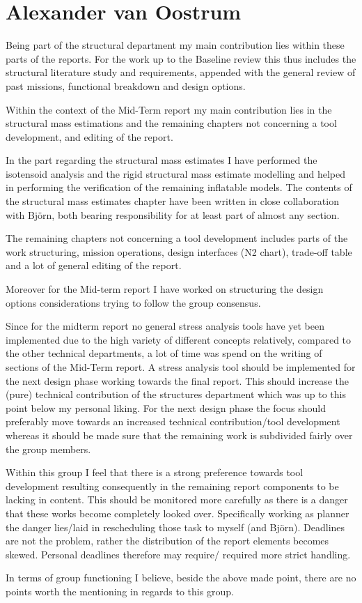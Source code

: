 \section{Alexander van Oostrum}

Being part of the structural department my main contribution lies within these parts of the reports. For the work up to the Baseline review this thus includes the structural literature study and requirements, appended with the general review of past missions, functional breakdown and design options. 

Within the context of the Mid-Term report my main contribution lies in the structural mass estimations and the remaining chapters not concerning a tool development, and editing of the report.

In the part regarding the structural mass estimates I have performed the isotensoid analysis and the rigid structural mass estimate modelling and helped in performing the verification of the remaining inflatable models.  The contents of the structural mass estimates chapter have been written in close collaboration with Bj\"{o}rn, both bearing responsibility for at least part of almost any section.

The remaining chapters not concerning a tool development includes parts of the work structuring, mission operations, design interfaces (N2 chart), trade-off table and a lot of general editing of the report.

Moreover for the Mid-term report I have worked on structuring the design options considerations trying to follow the group consensus.

Since for the midterm report no general stress analysis tools have yet been implemented due to the high variety of different concepts relatively, compared to the other technical departments, a lot of time was spend on the writing of sections of the Mid-Term report.  A stress analysis tool should be implemented for the next design phase working towards the final report. This should increase the (pure) technical contribution of the structures department which was up to this point below my personal liking. For the next design phase the focus should preferably move towards an increased technical contribution/tool development whereas it should be made sure that the remaining work is subdivided fairly over the group members.

Within this group I feel that there is a strong preference towards tool development resulting consequently in the remaining report components to be lacking in content. This should be monitored more carefully as there is a danger that these works become completely looked over. Specifically working as planner the danger lies/laid in rescheduling those task to myself (and Bj\"{o}rn). Deadlines are not the problem, rather the distribution of the report elements becomes skewed. Personal deadlines therefore may require/ required more strict handling. 

In terms of group functioning I believe, beside the above made point, there are no points worth the mentioning in regards to this group. 
 

